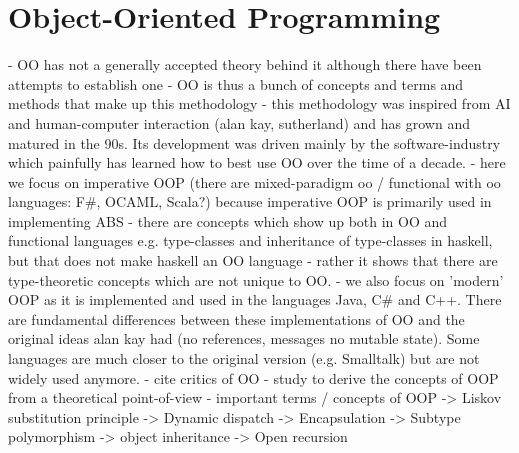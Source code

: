 \chapter{Object-Oriented Programming}
- OO has not a generally accepted theory behind it although there have been attempts to establish one \cite{abadi_theory_1996}
- OO is thus a bunch of concepts and terms and methods that make up this methodology - this methodology was inspired from AI and human-computer interaction (alan kay, sutherland) and has grown and matured in the 90s. Its development was driven mainly by the software-industry which painfully has learned how to best use OO over the time of a decade.
- here we focus on imperative OOP (there are mixed-paradigm oo / functional with oo languages: F\#, OCAML, Scala?) because imperative OOP is primarily used in implementing ABS
- there are concepts which show up both in OO and functional languages e.g. type-classes and inheritance of type-classes in haskell, but that does not make haskell an OO language - rather it shows that there are type-theoretic concepts which are not unique to OO.
- we also focus on 'modern' OOP as it is implemented and used in the languages Java, C\# and C++. There are fundamental differences between these implementations of OO and the original ideas alan kay had (no references, messages no mutable state). Some languages are much closer to the original version (e.g. Smalltalk) but are not widely used anymore.
- cite critics of OO
- study \cite{abadi_theory_1996} to derive the concepts of OOP from a theoretical point-of-view
- important terms / concepts of OOP
	-> Liskov substitution principle
	-> Dynamic dispatch
	-> Encapsulation
	-> Subtype polymorphism
	-> object inheritance 
	-> Open recursion